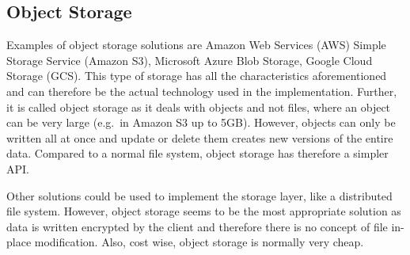 \subsection{Object Storage}  
Examples of object storage solutions are Amazon Web Services (AWS)
Simple Storage Service (Amazon S3), Microsoft Azure Blob Storage, Google Cloud Storage (GCS).
This type of storage has all the characteristics aforementioned and can 
therefore be the actual technology used in the implementation. 
Further, it is called object storage as it deals with objects and not files, 
where an object can be very large (e.g.\ in Amazon S3 up to 5GB).
However, objects can only be written all at once
and update or delete them creates new versions of the entire data.
Compared to a normal file system, object storage has therefore a simpler API.

Other solutions could be used to implement the storage layer,
like a distributed file system.
However, object storage seems to be the most appropriate
solution as data is written encrypted by the client and therefore
there is no concept of file in-place modification.
Also, cost wise, object storage is normally very cheap.

